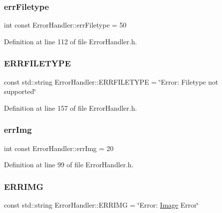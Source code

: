 \subsubsection{\texorpdfstring{errFiletype}{errFiletype}}
{\footnotesize\ttfamily int const Error\+Handler\+::err\+Filetype = 50\hspace{0.3cm}{\ttfamily [static]}}



Definition at line 112 of file Error\+Handler.\+h.

\mbox{\label{classErrorHandler_abc06f91cc00179b2993cb558770c4d80}} 
\subsubsection{\texorpdfstring{ERRFILETYPE}{ERRFILETYPE}}
{\footnotesize\ttfamily const std\+::string Error\+Handler\+::\+E\+R\+R\+F\+I\+L\+E\+T\+Y\+PE = \char`\"{}Error\+: Filetype not supported\char`\"{}\hspace{0.3cm}{\ttfamily [static]}}



Definition at line 157 of file Error\+Handler.\+h.

\mbox{\label{classErrorHandler_ad0d235ee5e68a371b7369ab80513d4ec}} 
\subsubsection{\texorpdfstring{errImg}{errImg}}
{\footnotesize\ttfamily int const Error\+Handler\+::err\+Img = 20\hspace{0.3cm}{\ttfamily [static]}}



Definition at line 99 of file Error\+Handler.\+h.

\mbox{\label{classErrorHandler_a0e6e270374c8c2d2bf1cf3525e2b185b}} 
\subsubsection{\texorpdfstring{ERRIMG}{ERRIMG}}
{\footnotesize\ttfamily const std\+::string Error\+Handler\+::\+E\+R\+R\+I\+MG = \char`\"{}Error\+: \mbox{\hyperlink{classImage}{Image}} Error\char`\"{}\hspace{0.3cm}{\ttfamily [static]}}



